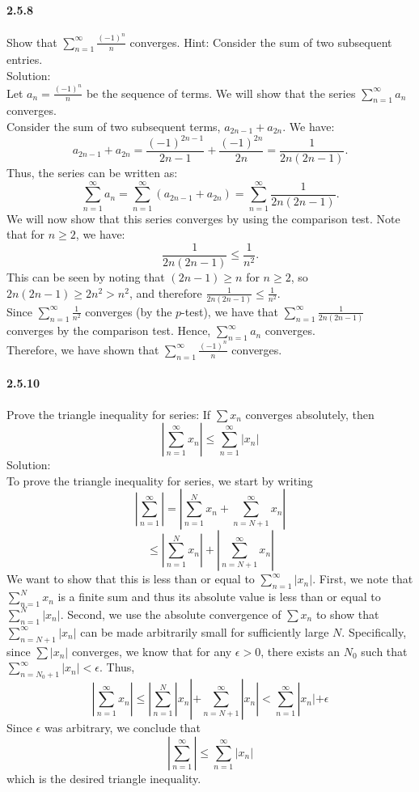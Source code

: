 \documentclass{article}
\begin{document}
\paragraph{2.5.8}
Show that $\sum_{n=1}^{\infty}\frac{(-1)^n}{n}$ converges. Hint: Consider the sum of two subsequent entries.\\
Solution:\\
Let $a_n = \frac{(-1)^n}{n}$ be the sequence of terms. We will show that the series $\sum_{n=1}^{\infty} a_n$ converges.\\
Consider the sum of two subsequent terms, $a_{2n-1} + a_{2n}$. We have:
$$a_{2n-1} + a_{2n} = \frac{(-1)^{2n-1}}{2n-1} + \frac{(-1)^{2n}}{2n} = \frac{1}{2n(2n-1)}.$$
Thus, the series can be written as:
$$\sum_{n=1}^{\infty} a_n = \sum_{n=1}^{\infty} (a_{2n-1} + a_{2n}) = \sum_{n=1}^{\infty} \frac{1}{2n(2n-1)}.$$
We will now show that this series converges by using the comparison test. Note that for $n\geq 2$, we have:
$$\frac{1}{2n(2n-1)} \leq \frac{1}{n^2}.$$
This can be seen by noting that $(2n-1) \geq n$ for $n \geq 2$, so $2n(2n-1) \geq 2n^2 > n^2$, and therefore $\frac{1}{2n(2n-1)} \leq \frac{1}{n^2}$.\\
Since $\sum_{n=1}^{\infty} \frac{1}{n^2}$ converges (by the $p$-test), we have that $\sum_{n=1}^{\infty} \frac{1}{2n(2n-1)}$ converges by the comparison test. Hence, $\sum_{n=1}^{\infty} a_n$ converges.\\
Therefore, we have shown that $\sum_{n=1}^{\infty}\frac{(-1)^n}{n}$ converges.
\paragraph{2.5.10}
Prove the triangle inequality for series: If $\sum x_n$ converges absolutely, then
$$|\sum_{n=1}^{\infty}x_n|\leq \sum_{n=1}^{\infty}|x_n|$$
Solution:\\
To prove the triangle inequality for series, we start by writing 
$$|\sum_{n=1}^{\infty}|=|\sum_{n=1}^{N}x_n+\sum_{n=N+1}^{\infty}x_n|$$
$$\leq |\sum_{n=1}^{N}x_n|+|\sum_{n=N+1}^{\infty}x_n|$$
We want to show that this is less than or equal to $\sum_{n=1}^{\infty} |x_n|$. First, we note that $\sum_{n=1}^{N} x_n$ is a finite sum and thus its absolute value is less than or equal to $\sum_{n=1}^{N} |x_n|$. Second, we use the absolute convergence of $\sum x_n$ to show that $\sum_{n=N+1}^{\infty} |x_n|$ can be made arbitrarily small for sufficiently large $N$. Specifically, since $\sum |x_n|$ converges, we know that for any $\epsilon > 0$, there exists an $N_0$ such that $\sum_{n=N_0+1}^{\infty} |x_n| < \epsilon$. Thus,
$$|\sum_{n=1}^{\infty}x_n|\leq|\sum_{n=1}^{N}|x_n|+\sum_{n=N+1}^{\infty}|x_n|<\sum_{n=1}^{\infty}|x_n|+\epsilon$$
Since $\epsilon$ was arbitrary, we conclude that
$$|\sum_{n=1}^{\infty}|\leq\sum_{n=1}^{\infty}|x_n|$$
which is the desired triangle inequality.
\end{document}
